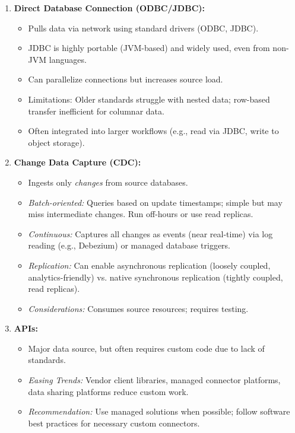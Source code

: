 \begin{enumerate}
    \item \textbf{Direct Database Connection (ODBC/JDBC):}
    \begin{itemize}[label=\textbullet]
        \item Pulls data via network using standard drivers (ODBC, JDBC).
        \item JDBC is highly portable (JVM-based) and widely used, even from non-JVM languages.
        \item Can parallelize connections but increases source load.
        \item Limitations: Older standards struggle with nested data; row-based transfer inefficient for columnar data.
        \item Often integrated into larger workflows (e.g., read via JDBC, write to object storage).
    \end{itemize}

    \item \textbf{Change Data Capture (CDC):}
    \begin{itemize}[label=\textbullet]
        \item Ingests only \textit{changes} from source databases.
        \item \textit{Batch-oriented:} Queries based on update timestamps; simple but may miss intermediate changes. Run off-hours or use read replicas.
        \item \textit{Continuous:} Captures all changes as events (near real-time) via log reading (e.g., Debezium) or managed database triggers.
        \item \textit{Replication:} Can enable asynchronous replication (loosely coupled, analytics-friendly) vs. native synchronous replication (tightly coupled, read replicas).
        \item \textit{Considerations:} Consumes source resources; requires testing.
    \end{itemize}

    \item \textbf{APIs:}
    \begin{itemize}[label=\textbullet]
        \item Major data source, but often requires custom code due to lack of standards.
        \item \textit{Easing Trends:} Vendor client libraries, managed connector platforms, data sharing platforms reduce custom work.
        \item \textit{Recommendation:} Use managed solutions when possible; follow software best practices for necessary custom connectors.
    \end{itemize}


\end{enumerate}
